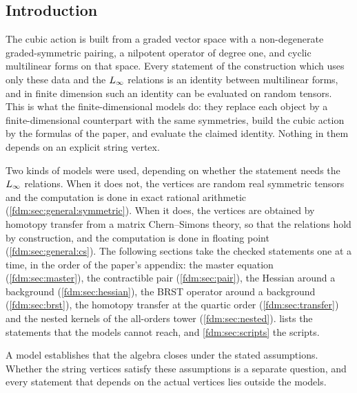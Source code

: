 \subsection{Introduction}
\label{fdm:sec:intro}

The cubic action is built from a graded vector space with a non-degenerate graded-symmetric pairing, a nilpotent operator of degree one, and cyclic multilinear forms on that space.
Every statement of the construction which uses only these data and the $L_\infty$ relations is an identity between multilinear forms, and in finite dimension such an identity can be evaluated on random tensors.
This is what the finite-dimensional models do: they replace each object by a finite-dimensional counterpart with the same symmetries, build the cubic action by the formulas of the paper, and evaluate the claimed identity.
Nothing in them depends on an explicit string vertex.

Two kinds of models were used, depending on whether the statement needs the $L_\infty$ relations.
When it does not, the vertices are random real symmetric tensors and the computation is done in exact rational arithmetic (\cref{fdm:sec:general:symmetric}).
When it does, the vertices are obtained by homotopy transfer from a matrix Chern--Simons theory, so that the relations hold by construction, and the computation is done in floating point (\cref{fdm:sec:general:cs}).
The following sections take the checked statements one at a time, in the order of the paper's appendix: the master equation (\cref{fdm:sec:master}), the contractible pair (\cref{fdm:sec:pair}), the Hessian around a background (\cref{fdm:sec:hessian}), the BRST operator around a background (\cref{fdm:sec:brst}), the homotopy transfer at the quartic order (\cref{fdm:sec:transfer}) and the nested kernels of the all-orders tower (\cref{fdm:sec:nested}).
 lists the statements that the models cannot reach, and \cref{fdm:sec:scripts} the scripts.

A model establishes that the algebra closes under the stated assumptions.
Whether the string vertices satisfy these assumptions is a separate question, and every statement that depends on the actual vertices lies outside the models.

